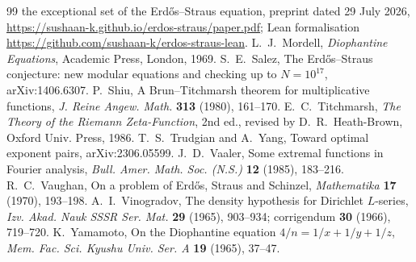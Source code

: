 \documentclass[11pt,reqno]{amsart}
\theoremstyle{definition}
\begin{document}
\begin{thebibliography}{99}
the exceptional set of the Erd\H{o}s--Straus equation, preprint dated
29 July 2026, \url{https://sushaan-k.github.io/erdos-straus/paper.pdf};
Lean formalisation \url{https://github.com/sushaan-k/erdos-straus-lean}.
 L.~J.~Mordell, \emph{Diophantine Equations}, Academic
Press, London, 1969.
 S.~E.~Salez, The Erd\H{o}s--Straus conjecture: new
modular equations and checking up to $N=10^{17}$, arXiv:1406.6307.
 P.~Shiu, A Brun--Titchmarsh theorem for multiplicative
functions, \emph{J. Reine Angew. Math.} \textbf{313} (1980), 161--170.
 E.~C.~Titchmarsh, \emph{The Theory of the Riemann
Zeta-Function}, 2nd ed., revised by D.~R.~Heath-Brown, Oxford Univ.
Press, 1986.
 T.~S.~Trudgian and A.~Yang, Toward optimal exponent pairs,
arXiv:2306.05599.
 J.~D.~Vaaler, Some extremal functions in Fourier
analysis, \emph{Bull. Amer. Math. Soc. (N.S.)} \textbf{12} (1985),
183--216.
 R.~C.~Vaughan, On a problem of Erd\H{o}s, Straus and
Schinzel, \emph{Mathematika} \textbf{17} (1970), 193--198.
 A.~I.~Vinogradov, The density hypothesis for Dirichlet
$L$-series, \emph{Izv. Akad. Nauk SSSR Ser. Mat.} \textbf{29} (1965),
903--934; corrigendum \textbf{30} (1966), 719--720.
 K.~Yamamoto, On the Diophantine equation
$4/n=1/x+1/y+1/z$, \emph{Mem. Fac. Sci. Kyushu Univ. Ser. A} \textbf{19}
(1965), 37--47.
\end{thebibliography}
\end{document}
